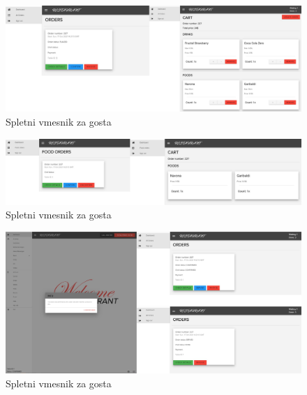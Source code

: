 \documentclass[a4paper, 12pt]{book}
\begin{document}
\begin{figure}[!htb]
\begin{center}
\includegraphics[width=14cm]{opis2.jpg}
\caption{Spletni vmesnik za gosta}
\label{Opis2}
\end{center}
\end{figure}
	
\begin{figure}[!htb]
\begin{center}
\includegraphics[width=14cm]{opis3.jpg}
\caption{Spletni vmesnik za gosta}
\label{Opis2}
\end{center}
\end{figure}

\begin{figure}[!htb]
\begin{center}
\includegraphics[width=14cm]{opis4.jpg}
\caption{Spletni vmesnik za gosta}
\label{Opis2}
\end{center}
\end{figure}
\end{document}
